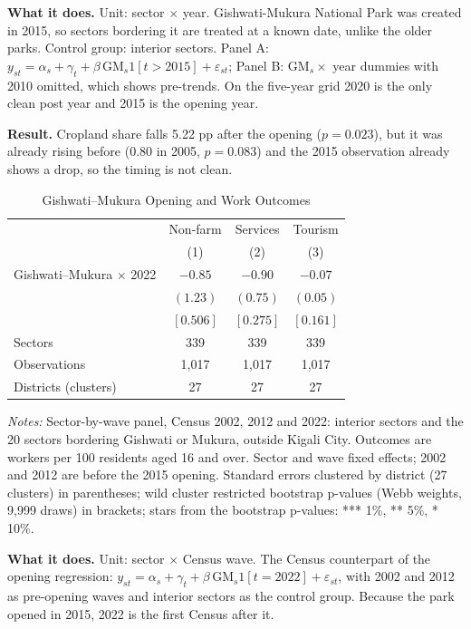 \documentclass[11pt]{article}
\begin{document}
\textbf{What it does.} Unit: sector $\times$ year. Gishwati-Mukura National Park was created in 2015, so sectors bordering it are treated at a known date, unlike the older parks. Control group: interior sectors. Panel A: $y_{st} = \alpha_s + \gamma_t + \beta\,\mathrm{GM}_s 1[t>2015] + \varepsilon_{st}$; Panel B: $\mathrm{GM}_s \times$ year dummies with 2010 omitted, which shows pre-trends. On the five-year grid 2020 is the only clean post year and 2015 is the opening year.

\textbf{Result.} Cropland share falls 5.22 pp after the opening ($p=0.023$), but it was already rising before (0.80 in 2005, $p=0.083$) and the 2015 observation already shows a drop, so the timing is not clean.
\clearpage
\begin{table}[H]
\centering\small\setlength{\tabcolsep}{4pt}
\caption{Gishwati--Mukura Opening and Work Outcomes}
\label{tab:open_census}
\begin{tabular}{lccc}
\toprule
 & Non-farm & Services & Tourism \\
 & (1) & (2) & (3) \\
\midrule
Gishwati--Mukura $\times$ 2022 & $-0.85$ & $-0.90$ & $-0.07$ \\
 & $(1.23)$ & $(0.75)$ & $(0.05)$ \\
 & $[0.506]$ & $[0.275]$ & $[0.161]$ \\
\midrule
Sectors & 339 & 339 & 339 \\
Observations & 1,017 & 1,017 & 1,017 \\
Districts (clusters) & 27 & 27 & 27 \\
\bottomrule
\end{tabular}
\begin{minipage}{0.95\textwidth}\footnotesize
\textit{Notes:} Sector-by-wave panel, Census 2002, 2012 and 2022: interior sectors and the 20 sectors bordering Gishwati or Mukura, outside Kigali City. Outcomes are workers per 100 residents aged 16 and over. Sector and wave fixed effects; 2002 and 2012 are before the 2015 opening. Standard errors clustered by district (27 clusters) in parentheses; wild cluster restricted bootstrap p-values (Webb weights, 9,999 draws) in brackets; stars from the bootstrap p-values: *** 1\%, ** 5\%, * 10\%.
\end{minipage}
\end{table}
\textbf{What it does.} Unit: sector $\times$ Census wave. The Census counterpart of the opening regression: $y_{st} = \alpha_s + \gamma_t + \beta\,\mathrm{GM}_s 1[t{=}2022] + \varepsilon_{st}$, with 2002 and 2012 as pre-opening waves and interior sectors as the control group. Because the park opened in 2015, 2022 is the first Census after it.
\end{document}
